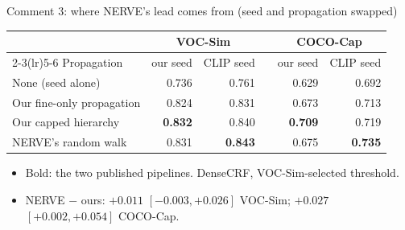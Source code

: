 
\begin{frame}{Comment 3: where NERVE's lead comes from (seed and propagation swapped)}
\begin{slidetable}
\begin{tabular}{lrrcrr}
\toprule
 & \multicolumn{2}{c}{VOC-Sim} & & \multicolumn{2}{c}{COCO-Cap} \\
\cmidrule(lr){2-3}\cmidrule(lr){5-6}
Propagation & our seed & CLIP seed & & our seed & CLIP seed \\
\midrule
None (seed alone)            & 0.736 & 0.761 & & 0.629 & 0.692 \\
Our fine-only propagation    & 0.824 & 0.831 & & 0.673 & 0.713 \\
Our capped hierarchy         & \textbf{0.832} & 0.840 & & \textbf{0.709} & 0.719 \\
NERVE's random walk          & 0.831 & \textbf{0.843} & & 0.675 & \textbf{0.735} \\
\bottomrule
\end{tabular}
\end{slidetable}
\begin{itemize}
  \item Bold: the two published pipelines. DenseCRF, VOC-Sim-selected threshold.
  \item NERVE $-$ ours: $+0.011$ $[-0.003, +0.026]$ VOC-Sim; $+0.027$ $[+0.002, +0.054]$ COCO-Cap.
\end{itemize}
\end{frame}

